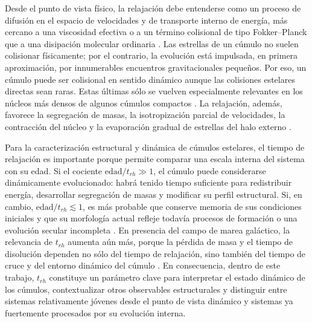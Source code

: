     Desde el punto de vista físico, la relajación debe entenderse como un 
    proceso de difusión en el espacio de velocidades y de transporte interno de 
    energía, más cercano a una viscosidad efectiva o a un término colisional de 
    tipo Fokker--Planck que a una disipación molecular ordinaria 
    \cite{BinneyTremaine2008,Hamilton2018}. Las estrellas de un cúmulo no suelen 
    colisionar físicamente; por el contrario, la evolución está impulsada, en 
    primera aproximación, por innumerables encuentros gravitacionales pequeños. 
    Por eso, un cúmulo puede ser colisional en sentido dinámico aunque las 
    colisiones estelares directas sean raras. Estas últimas sólo se vuelven 
    especialmente relevantes en los núcleos más densos de algunos cúmulos 
    compactos \cite{MeylanHeggie1997,PortegiesZwart2010}. La relajación, además, 
    favorece la segregación de masas, la isotropización parcial de velocidades, 
    la contracción del núcleo y la evaporación gradual de estrellas del halo 
    externo \cite{Spitzer1987,MeylanHeggie1997}.

    Para la caracterización estructural y dinámica de cúmulos estelares, el 
    tiempo de relajación es importante porque permite comparar una escala 
    interna del sistema con su edad. Si el cociente $\mathrm{edad}/t_{rh}\gg 1$, 
    el cúmulo puede considerarse dinámicamente evolucionado: habrá tenido tiempo 
    suficiente para redistribuir energía, desarrollar segregación de masas y 
    modificar su perfil estructural. Si, en cambio, 
    $\mathrm{edad}/t_{rh}\lesssim 1$, es más probable que conserve memoria de 
    sus condiciones iniciales y que su morfología actual refleje todavía 
    procesos de formación o una evolución secular incompleta 
    \cite{Spitzer1987,MeylanHeggie1997}. En presencia del campo de marea 
    galáctico, la relevancia de $t_{rh}$ aumenta aún más, porque la pérdida de 
    masa y el tiempo de disolución dependen no sólo del tiempo de relajación, 
    sino también del tiempo de cruce y del entorno dinámico del cúmulo 
    \cite{Lamers2005}. En consecuencia, dentro de este trabajo, $t_{rh}$ 
    constituye un parámetro clave para interpretar el estado dinámico de los 
    cúmulos, contextualizar otros observables estructurales y distinguir entre 
    sistemas relativamente jóvenes desde el punto de vista dinámico y sistemas 
    ya fuertemente procesados por su evolución interna.

